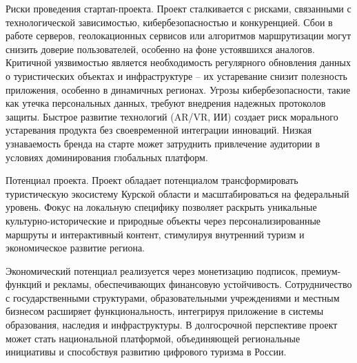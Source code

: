Риски проведения стартап-проекта. Проект сталкивается с рисками, связанными с технологической зависимостью, кибербезопасностью и конкуренцией. Сбои в работе серверов, геолокационных сервисов или алгоритмов маршрутизации могут снизить доверие пользователей, особенно на фоне устоявшихся аналогов. Критичной уязвимостью является необходимость регулярного обновления данных о туристических объектах и инфраструктуре – их устаревание снизит полезность приложения, особенно в динамичных регионах. Угрозы кибербезопасности, такие как утечка персональных данных, требуют внедрения надежных протоколов защиты. Быстрое развитие технологий (AR/VR, ИИ) создает риск морального устаревания продукта без своевременной интеграции инноваций. Низкая узнаваемость бренда на старте может затруднить привлечение аудитории в условиях доминирования глобальных платформ.

Потенциал проекта. Проект обладает потенциалом трансформировать туристическую экосистему Курской области и масштабироваться на федеральный уровень. Фокус на локальную специфику позволяет раскрыть уникальные культурно-исторические и природные объекты через персонализированные маршруты и интерактивный контент, стимулируя внутренний туризм и экономическое развитие региона. 

Экономический потенциал реализуется через монетизацию подписок, премиум-функций и рекламы, обеспечивающих финансовую устойчивость. Сотрудничество с государственными структурами, образовательными учреждениями и местным бизнесом расширяет функциональность, интегрируя приложение в системы образования, наследия и инфраструктуры. В долгосрочной перспективе проект может стать национальной платформой, объединяющей региональные инициативы и способствуя развитию цифрового туризма в России.  


